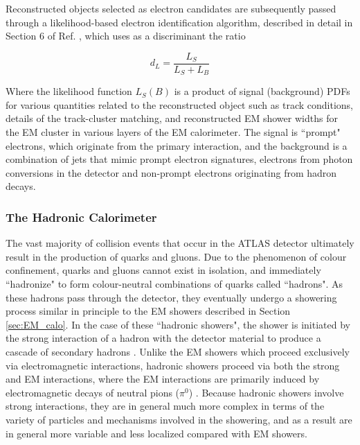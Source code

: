 Reconstructed objects selected as electron candidates are subsequently passed through a likelihood-based electron identification algorithm, described in detail in Section 6 of Ref. \cite{electron_reco}, which uses as a discriminant the ratio 

\begin{equation}
\label{eq:electron_likelihood_id_discriminant}
d_L = \frac{L_S}{L_S+L_B}
\end{equation}

Where the likelihood function $L_S(B)$ is a product of signal (background) PDFs for various quantities related to the reconstructed object such as track conditions, details of the track-cluster matching, and reconstructed EM shower widths for the EM cluster in various layers of the EM calorimeter. The signal is ``prompt" electrons, which originate from the primary interaction, and the background is a combination of jets that mimic prompt electron signatures, electrons from photon conversions in the detector and non-prompt electrons originating from hadron decays.

\subsubsection{The Hadronic Calorimeter}

The vast majority of collision events that occur in the ATLAS detector ultimately result in the production of quarks and gluons. Due to the phenomenon of colour confinement, quarks and gluons cannot exist in isolation, and immediately ``hadronize" to form colour-neutral combinations of quarks called ``hadrons". As these hadrons pass through the detector, they eventually undergo a showering process similar in principle to the EM showers described in Section \ref{sec:EM_calo}. In the case of these ``hadronic showers", the shower is initiated by the strong interaction of a hadron with the detector material to produce a cascade of secondary hadrons \cite{shower_theory}. Unlike the EM showers which proceed exclusively via electromagnetic interactions, hadronic showers proceed via both the strong and EM interactions, where the EM interactions are primarily induced by electromagnetic decays of neutral pions ($\pi^0$) \cite{shower_theory}. Because hadronic showers involve strong interactions, they are in general much more complex in terms of the variety of particles and mechanisms involved in the showering, and as a result are in general more variable and less localized compared with EM showers.

